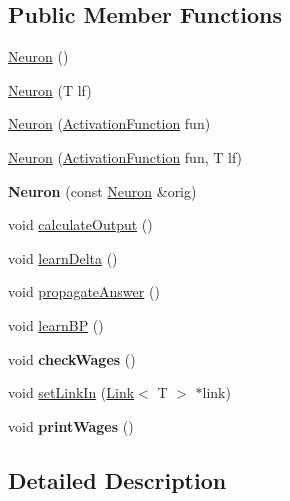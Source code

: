 \subsection*{\-Public \-Member \-Functions}
\begin{DoxyCompactItemize}
\item 
\hyperlink{class_neuron_ada8bb503f1bd56ce2596eabf8c21877e}{\-Neuron} ()
\item 
\hyperlink{class_neuron_a6145b98854c0fb6e9cfe09336952a5dc}{\-Neuron} (\-T lf)
\item 
\hyperlink{class_neuron_afff69f38459625c7d376e5f5e2e34a9d}{\-Neuron} (\hyperlink{class_activation_function}{\-Activation\-Function} fun)
\item 
\hyperlink{class_neuron_a1c7ea1b973546b185e6ec0c29b740453}{\-Neuron} (\hyperlink{class_activation_function}{\-Activation\-Function} fun, \-T lf)
\item 
\hypertarget{class_neuron_a69874cefdd2d0c8898b977a6a2bdf5ef}{{\bfseries \-Neuron} (const \hyperlink{class_neuron}{\-Neuron} \&orig)}\label{class_neuron_a69874cefdd2d0c8898b977a6a2bdf5ef}

\item 
void \hyperlink{class_neuron_a36c60982cb604f2fa6a1765177a9c2e7}{calculate\-Output} ()
\item 
void \hyperlink{class_neuron_ae73a056c55311521d0e31347837109cc}{learn\-Delta} ()
\item 
void \hyperlink{class_neuron_acb55ff03a770877b6afb86ed4d06896a}{propagate\-Answer} ()
\item 
void \hyperlink{class_neuron_a5e479fce295d76be68c017ab8c986f8c}{learn\-B\-P} ()
\item 
\hypertarget{class_neuron_a7ab012ac0a6a20b474b6147fcdc6ea2d}{void {\bfseries check\-Wages} ()}\label{class_neuron_a7ab012ac0a6a20b474b6147fcdc6ea2d}

\item 
void \hyperlink{class_neuron_a1a20d9ac9bf64126f8d74d8c1c7d3c58}{set\-Link\-In} (\hyperlink{class_link}{\-Link}$<$ \-T $>$ $\ast$link)
\item 
\hypertarget{class_neuron_ac112e85f169835dad11a6f7bd9e477b9}{void {\bfseries print\-Wages} ()}\label{class_neuron_ac112e85f169835dad11a6f7bd9e477b9}

\end{DoxyCompactItemize}


\subsection{\-Detailed \-Description}
